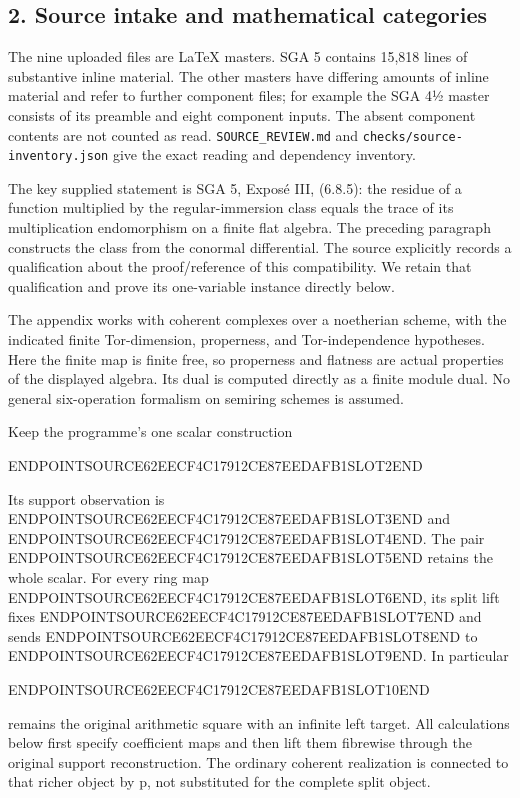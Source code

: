 \subsection{2. Source intake and mathematical categories}\label{endpoint-sga_trace_period--source-intake-and-mathematical-categories}

The nine uploaded files are LaTeX masters. SGA 5 contains 15,818 lines of substantive inline material. The other masters have differing amounts of inline material and refer to further component files; for example the SGA 4½ master consists of its preamble and eight component inputs. The absent component contents are not counted as read. \texttt{SOURCE\_REVIEW.md} and \texttt{checks/source-inventory.json} give the exact reading and dependency inventory.

The key supplied statement is SGA 5, Exposé III, (6.8.5): the residue of a function multiplied by the regular-immersion class equals the trace of its multiplication endomorphism on a finite flat algebra. The preceding paragraph constructs the class from the conormal differential. The source explicitly records a qualification about the proof/reference of this compatibility. We retain that qualification and prove its one-variable instance directly below.

The appendix works with coherent complexes over a noetherian scheme, with the indicated finite Tor-dimension, properness, and Tor-independence hypotheses. Here the finite map is finite free, so properness and flatness are actual properties of the displayed algebra. Its dual is computed directly as a finite module dual. No general six-operation formalism on semiring schemes is assumed.

Keep the programme's one scalar construction

ENDPOINTSOURCE62EECF4C17912CE87EEDAFB1SLOT2END

Its support observation is ENDPOINTSOURCE62EECF4C17912CE87EEDAFB1SLOT3END and ENDPOINTSOURCE62EECF4C17912CE87EEDAFB1SLOT4END. The pair ENDPOINTSOURCE62EECF4C17912CE87EEDAFB1SLOT5END retains the whole scalar. For every ring map ENDPOINTSOURCE62EECF4C17912CE87EEDAFB1SLOT6END, its split lift fixes ENDPOINTSOURCE62EECF4C17912CE87EEDAFB1SLOT7END and sends ENDPOINTSOURCE62EECF4C17912CE87EEDAFB1SLOT8END to ENDPOINTSOURCE62EECF4C17912CE87EEDAFB1SLOT9END. In particular

ENDPOINTSOURCE62EECF4C17912CE87EEDAFB1SLOT10END

remains the original arithmetic square with an infinite left target. All calculations below first specify coefficient maps and then lift them fibrewise through the original support reconstruction. The ordinary coherent realization is connected to that richer object by p, not substituted for the complete split object.

